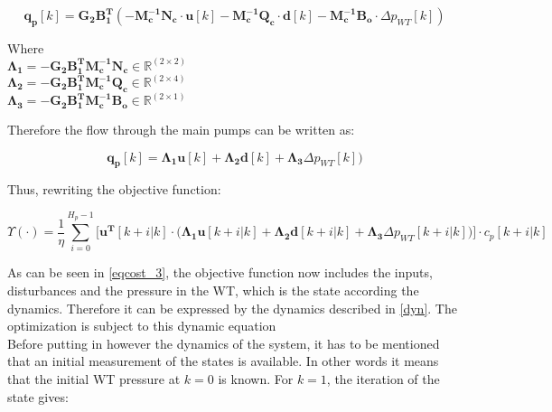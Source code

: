  \begin{equation}
 \bm{q_{p}}[k] =   \bm{G_{2}} \bm{B_{1}^T}(-\bm{M_c^{-1}}\bm{N_c} \cdot \bm{u}[k] -\bm{M_c^{-1}}\bm{Q_c} \cdot \bm{d}[k] -\bm{M_c^{-1}}\bm{B_{o}} \cdot \Delta p_{WT}[k])   
 \label{mappingandstates}
\end{equation}

\begin{minipage}[t]{0.80\textwidth}
Where\\
\hspace*{8mm} $\bm{\Lambda_1} = -\bm{G_{2}} \bm{B_{1}^T}\bm{M_c^{-1}}\bm{N_c} \in \pmb{\mathbb{R}}^{(2 \times 2)}$ \\
\hspace*{8mm} $\bm{\Lambda_2} = -\bm{G_{2}} \bm{B_{1}^T}\bm{M_c^{-1}}\bm{Q_c} \in \pmb{\mathbb{R}}^{(2 \times 4)}$ \\
\hspace*{8mm} $\bm{\Lambda_3} = -\bm{G_{2}} \bm{B_{1}^T}\bm{M_c^{-1}}\bm{B_{o}} \in \pmb{\mathbb{R}}^{(2 \times 1)}$ 
\end{minipage}

Therefore the flow through the main pumps can be written as: 

 \begin{equation}
 \bm{q_{p}}[k] =   \bm{\Lambda_1} \bm{u}[k] + \bm{\Lambda_2} \bm{d}[k] + \bm{\Lambda_3} \Delta p_{WT}[k])   
 \label{pumpflows_simplified}
\end{equation}

Thus, rewriting the objective function:

\begin{equation}
 \Upsilon(\cdot) = \frac{1}{\eta} \sum_{i=0}^{H_p-1} \Big[ \bm{u^T}[k+i|k] \cdot \Big(\bm{\Lambda_1} \bm{u}[k+i|k] + \bm{\Lambda_2} \bm{d}[k+i|k] + \bm{\Lambda_3} \Delta p_{WT}[k+i|k]\Big)\Big]  \cdot c_p[k+i|k]
\label{eqcost_3} 
\end{equation}

As can be seen in \eqref{eqcost_3}, the objective function now includes the inputs, disturbances and the pressure in the WT, which is the state according the dynamics. Therefore it can be expressed by the dynamics described in \eqref{dyn}. The optimization is subject to this dynamic equation
\\
Before putting in however the dynamics of the system, it has to be mentioned that an initial measurement of the states is available. In other words it means that the initial WT pressure at $k = 0$ is known. For $k=1$, the iteration of the state gives:

